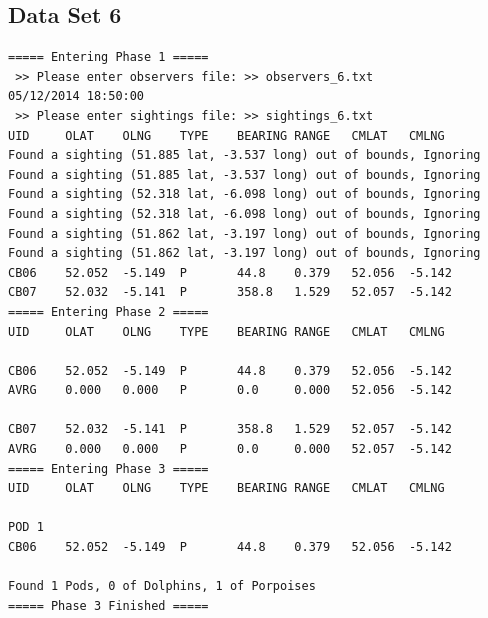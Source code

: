 \documentclass[10pt]{article}
\begin{document}
        \newpage
        \subsection{Data Set 6}
            \begin{verbatim}
===== Entering Phase 1 =====
 >> Please enter observers file: >> observers_6.txt
05/12/2014 18:50:00
 >> Please enter sightings file: >> sightings_6.txt
UID     OLAT    OLNG    TYPE    BEARING RANGE   CMLAT   CMLNG
Found a sighting (51.885 lat, -3.537 long) out of bounds, Ignoring
Found a sighting (51.885 lat, -3.537 long) out of bounds, Ignoring
Found a sighting (52.318 lat, -6.098 long) out of bounds, Ignoring
Found a sighting (52.318 lat, -6.098 long) out of bounds, Ignoring
Found a sighting (51.862 lat, -3.197 long) out of bounds, Ignoring
Found a sighting (51.862 lat, -3.197 long) out of bounds, Ignoring
CB06    52.052  -5.149  P       44.8    0.379   52.056  -5.142
CB07    52.032  -5.141  P       358.8   1.529   52.057  -5.142
===== Entering Phase 2 =====
UID     OLAT    OLNG    TYPE    BEARING RANGE   CMLAT   CMLNG

CB06    52.052  -5.149  P       44.8    0.379   52.056  -5.142
AVRG    0.000   0.000   P       0.0     0.000   52.056  -5.142

CB07    52.032  -5.141  P       358.8   1.529   52.057  -5.142
AVRG    0.000   0.000   P       0.0     0.000   52.057  -5.142
===== Entering Phase 3 =====
UID     OLAT    OLNG    TYPE    BEARING RANGE   CMLAT   CMLNG

POD 1
CB06    52.052  -5.149  P       44.8    0.379   52.056  -5.142

Found 1 Pods, 0 of Dolphins, 1 of Porpoises
===== Phase 3 Finished =====
            \end{verbatim}
\end{document}

